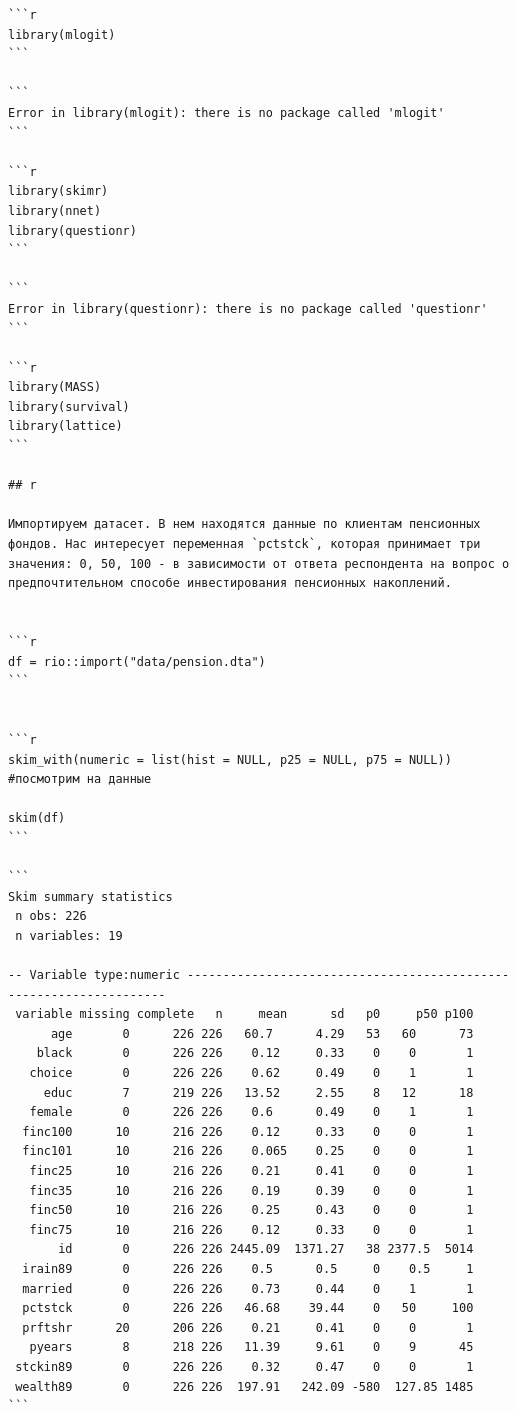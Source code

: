 \documentclass[]{book}
\begin{document}
\begin{verbatim}
```r
library(mlogit)
```

```
Error in library(mlogit): there is no package called 'mlogit'
```

```r
library(skimr)
library(nnet)
library(questionr)
```

```
Error in library(questionr): there is no package called 'questionr'
```

```r
library(MASS)
library(survival)
library(lattice)
```

## r

Импортируем датасет. В нем находятся данные по клиентам пенсионных фондов. Нас интересует переменная `pctstck`, которая принимает три значения: 0, 50, 100 - в зависимоcти от ответа респондента на вопрос о предпочтительном способе инвестирования пенсионных накоплений.   


```r
df = rio::import("data/pension.dta")
```


```r
skim_with(numeric = list(hist = NULL, p25 = NULL, p75 = NULL)) #посмотрим на данные

skim(df)
```

```
Skim summary statistics
 n obs: 226 
 n variables: 19 

-- Variable type:numeric -------------------------------------------------------------------
 variable missing complete   n     mean      sd   p0     p50 p100
      age       0      226 226   60.7      4.29   53   60      73
    black       0      226 226    0.12     0.33    0    0       1
   choice       0      226 226    0.62     0.49    0    1       1
     educ       7      219 226   13.52     2.55    8   12      18
   female       0      226 226    0.6      0.49    0    1       1
  finc100      10      216 226    0.12     0.33    0    0       1
  finc101      10      216 226    0.065    0.25    0    0       1
   finc25      10      216 226    0.21     0.41    0    0       1
   finc35      10      216 226    0.19     0.39    0    0       1
   finc50      10      216 226    0.25     0.43    0    0       1
   finc75      10      216 226    0.12     0.33    0    0       1
       id       0      226 226 2445.09  1371.27   38 2377.5  5014
  irain89       0      226 226    0.5      0.5     0    0.5     1
  married       0      226 226    0.73     0.44    0    1       1
  pctstck       0      226 226   46.68    39.44    0   50     100
  prftshr      20      206 226    0.21     0.41    0    0       1
   pyears       8      218 226   11.39     9.61    0    9      45
 stckin89       0      226 226    0.32     0.47    0    0       1
 wealth89       0      226 226  197.91   242.09 -580  127.85 1485
```



\end{verbatim}
\end{document}
